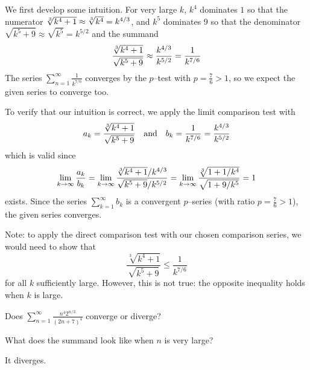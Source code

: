 \begin{solution}
We first develop some intuition. For very large $k$,
     $k^4$ dominates $1$ so that the numerator  $\root{3}\of{k^4+1}
       \approx  \root{3}\of{k^4} = k^{4/3}$,
 and $k^5$ dominates 9 so that the denominator $\sqrt{k^5+9}
       \approx \sqrt{k^5} = k^{5/2}$ and the summand
\begin{align*}
\frac{ \root{3}\of{k^4+1} }{\sqrt{k^5+9}}
\approx \frac{k^{4/3}}{k^{5/2}}
=\frac{1}{k^{7/6}}
\end{align*}
The series $\displaystyle \sum_{n=1}^{\infty} \frac{1}{k^{7/6}}$
converges by the $p$--test with $p=\frac{7}{6}>1$, so we expect the given series to converge too.

To verify that  our intuition is correct,
we apply the limit comparison test with
\begin{align*}
a_k= \frac{ \root{3}\of{k^4+1} }{\sqrt{k^5+9}}
               \quad\text{and}\quad
           b_k= \frac{1}{k^{7/6}}=\frac{k^{4/3}}{k^{5/2}}
\end{align*}
which is valid since
\begin{equation*}
\lim_{k\rightarrow\infty} \frac{a_k}{b_k}
=\lim_{k\rightarrow\infty}\frac{ \root{3}\of{k^4+1}/k^{4/3}}
                                  {\sqrt{k^5+9}/k^{5/2}}
=\lim_{k\rightarrow\infty}\frac{ \root{3}\of{1+1/k^4} }{\sqrt{1+9/k^5}}
=1
\end{equation*}
exists. Since the series $\sum\limits_{k=1}^\infty b_k$ is
a convergent $p$--series (with ratio $p=\frac{7}{6}>1$),
the given series converges.

Note: to apply the direct comparison test with our chosen comparison series, we would need to show that
\[\frac{\sqrt[3]{k^4+1}}{\sqrt{k^5+9}} \leq \frac{1}{k^{7/6}}\]
for all $k$ sufficiently large. However, this is not true: the opposite inequality holds when $k$ is large.
\end{solution}


\begin{Mquestion}[2016A]
Does $\displaystyle\sum_{n=1}^\infty\frac{n^4 2^{n/3}}{(2n+7)^4}$
converge or diverge?
\end{Mquestion}

\begin{hint}
What does the summand look like when $n$ is very large?
\end{hint}

\begin{answer}
It diverges.
\end{answer}

